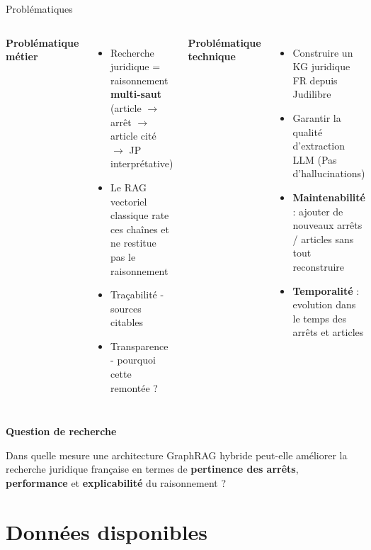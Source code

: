 \documentclass[aspectratio=169,10pt]{beamer}
\newcommand{\keybox}[1]{%
  \begin{center}
  \colorbox{accentsoft}{\parbox{0.9\linewidth}{\centering #1}}
  \end{center}}
\begin{document}
\begin{frame}{Problématiques}
  \begin{columns}[T]
    \textbf{Problématique métier}
    \begin{itemize}\footnotesize
      \item Recherche juridique = raisonnement \textbf{multi-saut} (article $\rightarrow$ arrêt $\rightarrow$ article cité $\rightarrow$ JP interprétative)
      \item Le RAG vectoriel classique rate ces chaînes et ne restitue pas le raisonnement
      \item {Traçabilité} - sources citables
      \item {Transparence} - pourquoi cette remontée ?
    \end{itemize}

    \textbf{Problématique technique}
    \begin{itemize}\footnotesize
      \item Construire un KG juridique FR depuis Judilibre
      \item Garantir la qualité d'extraction LLM (Pas d'hallucinations)
      \item \textbf{Maintenabilité} : ajouter de nouveaux arrêts / articles sans tout reconstruire 
      \item \textbf{Temporalité} : evolution dans le temps des arrêts et articles
    \end{itemize}
  \end{columns}

  \vspace{0.5em}
  \begin{center}
    \textbf{Question de recherche}
  \end{center}
  \keybox{Dans quelle mesure une architecture GraphRAG hybride peut-elle améliorer la recherche juridique française en termes de \textbf{pertinence des arrêts}, \textbf{performance} et \textbf{explicabilité} du raisonnement ?}
\end{frame}

\section{Données disponibles}
\end{document}
